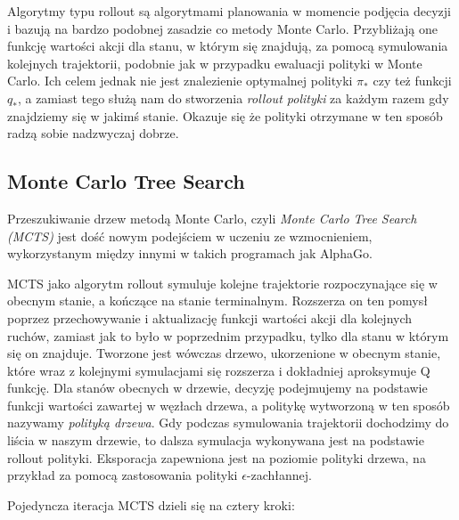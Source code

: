 \documentclass[licencjacka]{pracamgr}
\begin{document}
Algorytmy typu rollout są algorytmami planowania w momencie podjęcia decyzji  i bazują na bardzo podobnej zasadzie co metody Monte Carlo. Przybliżają one funkcję wartości akcji dla stanu, w którym się znajdują, za pomocą symulowania kolejnych trajektorii, podobnie jak w przypadku ewaluacji polityki w Monte Carlo. Ich celem jednak nie jest znalezienie optymalnej polityki $\pi_\ast$ czy też funkcji $q_\ast$, a zamiast tego służą nam do stworzenia \emph{rollout polityki} za każdym razem gdy znajdziemy się w jakimś stanie. Okazuje się że polityki otrzymane w ten sposób radzą sobie nadzwyczaj dobrze.

\subsection{Monte Carlo Tree Search}

Przeszukiwanie drzew metodą Monte Carlo, czyli \emph{Monte Carlo Tree Search (MCTS)} jest dość nowym podejściem w uczeniu ze wzmocnieniem, wykorzystanym między innymi w takich programach jak AlphaGo. 

MCTS jako algorytm rollout symuluje kolejne trajektorie rozpoczynające się w obecnym stanie, a kończące na stanie terminalnym. Rozszerza on ten pomysł poprzez przechowywanie i aktualizację funkcji wartości akcji dla kolejnych ruchów, zamiast jak to było w poprzednim przypadku, tylko dla stanu w którym się on znajduje. Tworzone jest wówczas drzewo, ukorzenione w obecnym stanie, które wraz z kolejnymi symulacjami się rozszerza i dokładniej aproksymuje Q funkcję. Dla stanów obecnych w drzewie, decyzję podejmujemy na podstawie funkcji wartości zawartej w węzłach drzewa, a politykę wytworzoną w ten sposób nazywamy \emph{polityką drzewa}. Gdy podczas symulowania trajektorii dochodzimy do liścia w naszym drzewie, to dalsza symulacja wykonywana jest na podstawie rollout polityki. Eksporacja zapewniona jest na poziomie polityki drzewa, na przykład za pomocą zastosowania polityki $\epsilon$-zachłannej.

Pojedyncza iteracja MCTS dzieli się na cztery kroki:
\end{document}
